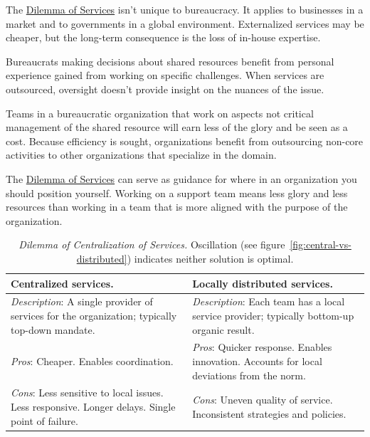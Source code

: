 The \hyperref[table:dilemma-org-inhouse-vs-external]{Dilemma of Services} isn't unique to bureaucracy. It applies to businesses in a market and to governments in a global environment. Externalized services may be cheaper, but the long-term consequence is the loss of in-house expertise. 


Bureaucrats making decisions about shared resources benefit from personal experience gained from working on specific challenges. 
When services are outsourced, oversight doesn't provide insight on the nuances of the issue.

Teams in a bureaucratic organization that work on aspects not critical management of the shared resource will earn less of the glory and be seen as a cost. Because efficiency is sought, organizations benefit from outsourcing non-core activities to other organizations that specialize in the domain.

The \hyperref[table:dilemma-org-inhouse-vs-external]{Dilemma of Services} can serve as guidance for where in an organization you should position yourself. Working on a support team means less glory and less resources than working in a team that is more aligned with the purpose of the organization.



\begin{center}
\begin{table}[H] %
\begin{tabular}{ | m{\dilemmatablewidth}| m{\dilemmatablewidth} | } 
  \hline
  \textbf{Centralized services.} &
  \textbf{Locally distributed services.} \\
  \hline
  \textit{Description}: A single provider of services for the organization; typically top-down mandate. &
  \textit{Description}: Each team has a local service provider; typically bottom-up organic result. \\  
  \hline
  \textit{Pros}: Cheaper. Enables coordination. &
  \textit{Pros}: Quicker response. 
  Enables innovation. 
  Accounts for local deviations from the norm. \\
  \hline
  \textit{Cons}: Less sensitive to local issues. Less responsive. Longer delays. Single point of failure.  & 
  \textit{Cons}: Uneven quality of service. Inconsistent strategies and policies. \\
  \hline
\end{tabular}
\caption{
\textit{Dilemma of Centralization of Services.}
Oscillation (see figure~\ref{fig:central-vs-distributed}) indicates neither solution is optimal.
}
\label{table:dilemma-org-central-vs-distributed}
\end{table}
\end{center}

